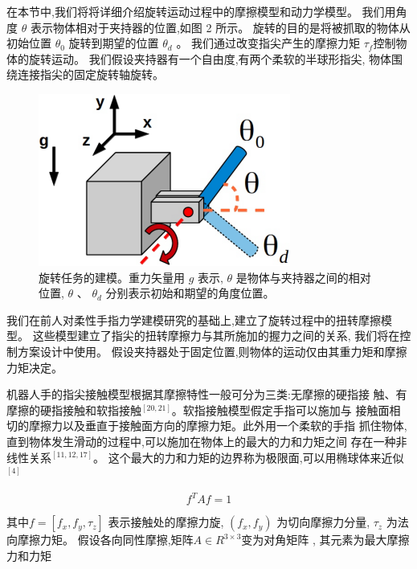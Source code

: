 在本节中,我们将将详细介绍旋转运动过程中的摩擦模型和动力学模型。
我们用角度 $\theta$ 表示物体相对于夹持器的位置,如图 2 所示。
旋转的目的是将被抓取的物体从初始位置 $\theta_0$ 旋转到期望的位置 $\theta_d$ 。
我们通过改变指尖产生的摩擦力矩 ${\tau _f}$控制物体的旋转运动。
我们假设夹持器有一个自由度,有两个柔软的半球形指尖,
物体围绕连接指尖的固定旋转轴旋转。

\begin{figure}[!ht]
  \centering
  \includegraphics[scale=0.9]{appendices/pic/3-1}
  \caption*{
    旋转任务的建模。重力矢量用 $g$ 表示,
    $\theta$ 是物体与夹持器之间的相对位置,
    $\theta$ 、 $\theta_d$ 分别表示初始和期望的角度位置。}
  \vspace{-0.3cm}
\end{figure}

我们在前人对柔性手指力学建模研究的基础上,建立了旋转过程中的扭转摩擦模型。
这些模型建立了指尖的扭转摩擦力与其所施加的握力之间的关系,
我们将在控制方案设计中使用。
假设夹持器处于固定位置,则物体的运动仅由其重力矩和摩擦力矩决定。

机器人手的指尖接触模型根据其摩擦特性一般可分为三类:无摩擦的硬指接
触、有摩擦的硬指接触和软指接触$^{[20, 21]}$。软指接触模型假定手指可以施加与
接触面相切的摩擦力以及垂直于接触面方向的摩擦力矩。此外用一个柔软的手指
抓住物体,直到物体发生滑动的过程中,可以施加在物体上的最大的力和力矩之间
存在一种非线性关系$^{[11, 12, 17]}$。
这个最大的力和力矩的边界称为极限面,可以用椭球体来近似$^{[4]}$

\vspace{-15pt}
\begin{equation}
  {f^T}Af = 1
\end{equation}

\noindent 其中$f = \left[ {{f_x},{f_y},{\tau _z}} \right]$ 表示接触处的摩擦力旋,
$\left( {{f_x},{f_y}} \right)$ 为切向摩擦力分量,
${\tau _z}$ 为法向摩擦力矩。
假设各向同性摩擦,矩阵$A \in {R^{3 \times 3}}$变为对角矩阵 ,
其元素为最大摩擦力和力矩

